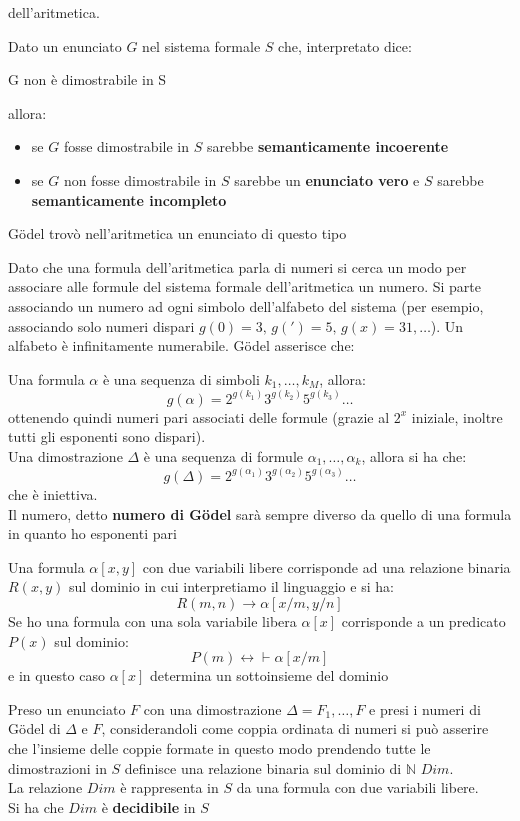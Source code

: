 \documentclass[a4paper,12pt, oneside]{book}
\begin{document}
dell'aritmetica.
\begin{teorema}
  Dato un enunciato $G$ nel sistema formale $S$ che, interpretato dice:
  \begin{center}
    G non è dimostrabile in S
  \end{center}
  allora:
  \begin{itemize}
    \item se $G$ fosse dimostrabile in $S$ sarebbe \textbf{semanticamente
      incoerente} 
    \item se $G$ non fosse dimostrabile in $S$ sarebbe un \textbf{enunciato
      vero} e $S$ sarebbe \textbf{semanticamente incompleto}
  \end{itemize}
  G\"{o}del trovò nell'aritmetica un enunciato di questo tipo
\end{teorema}
Dato che una formula dell'aritmetica parla di numeri si cerca un modo per
associare alle formule del sistema formale dell'aritmetica un numero. Si parte
associando un numero ad ogni simbolo dell'alfabeto del sistema (per esempio,
associando solo numeri dispari $g(0)=3,\,g(')=5,\,g(x)=31,\ldots$). Un alfabeto
è infinitamente numerabile. G\"{o}del asserisce che:
\begin{definizione}
  Una formula $\alpha$ è una sequenza di simboli $k_1,\ldots,k_M$, allora:
  \[g(\alpha)=2^{g(k_1)}3^{g(k_2)}5^{g(k_3)}\ldots\]
  ottenendo quindi numeri pari associati delle formule (grazie al
  $2^x$ iniziale, inoltre tutti gli esponenti sono dispari).\\
  Una dimostrazione $\Delta$ è una sequenza di formule
  $\alpha_1,\ldots,\alpha_k$, allora si ha che:
  \[g(\Delta)=2^{g(\alpha_1)}3^{g(\alpha_2)}5^{g(\alpha_3)}\ldots\]
  che è iniettiva.\\
  Il numero, detto \textbf{numero di G\"{o}del} sarà sempre diverso da quello di
  una formula in quanto ho esponenti pari
\end{definizione}
Una formula $\alpha[x,y]$ con due variabili libere corrisponde ad una relazione
binaria $R(x,y)$ sul dominio in cui interpretiamo il linguaggio e si ha:
\[R(m,n)\to\alpha[x/m,y/n]\]
Se ho una formula con una sola variabile libera $\alpha[x]$ corrisponde a un
predicato $P(x)$ sul dominio:
\[P(m)\leftrightarrow \vdash\alpha[x/m]\]
e in questo caso $\alpha[x]$ determina un sottoinsieme del dominio
\begin{definizione}
  Preso un enunciato $F$ con una dimostrazione $\Delta=F_1,\ldots,F$ e presi i
  numeri di G\"{o}del di $\Delta$ e $F$, considerandoli come coppia ordinata di
  numeri si può asserire che l'insieme delle coppie formate in questo modo
  prendendo tutte le dimostrazioni in $S$ definisce una relazione binaria sul
  dominio di $\mathbb{N}$ $Dim$.\\
  La relazione $Dim$ è rappresenta in $S$ da una formula con due variabili
  libere.\\
  Si ha che $Dim$ è \textbf{decidibile} in $S$
\end{definizione}
\end{document}
